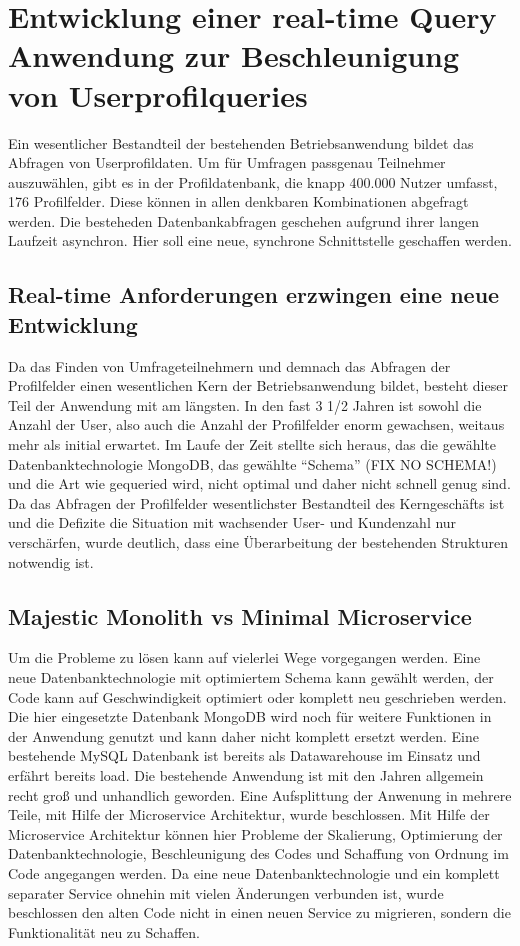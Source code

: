 \chapter{Entwicklung einer real-time Query Anwendung zur Beschleunigung von Userprofilqueries}
Ein wesentlicher Bestandteil der bestehenden Betriebsanwendung bildet das Abfragen von Userprofildaten. Um für Umfragen passgenau Teilnehmer auszuwählen, gibt es in der Profildatenbank, die knapp 400.000 Nutzer umfasst, 176 Profilfelder. Diese können in allen denkbaren Kombinationen abgefragt werden. Die besteheden Datenbankabfragen geschehen aufgrund ihrer langen Laufzeit asynchron. Hier soll eine neue, synchrone Schnittstelle geschaffen werden.

\section{Real-time Anforderungen erzwingen eine neue Entwicklung}
Da das Finden von Umfrageteilnehmern und demnach das Abfragen der Profilfelder einen wesentlichen Kern der Betriebsanwendung bildet, besteht dieser Teil der Anwendung mit am längsten. In den fast 3 1/2 Jahren ist sowohl die Anzahl der User, also auch die Anzahl der Profilfelder enorm gewachsen, weitaus mehr als initial erwartet. Im Laufe der Zeit stellte sich heraus, das die gewählte Datenbanktechnologie MongoDB, das gewählte ``Schema'' (FIX NO SCHEMA!) und die Art wie gequeried wird, nicht optimal und daher nicht schnell genug sind. Da das Abfragen der Profilfelder wesentlichster Bestandteil des Kerngeschäfts ist und die Defizite die Situation mit wachsender User- und Kundenzahl nur verschärfen, wurde deutlich, dass eine Überarbeitung der bestehenden Strukturen notwendig ist.

\section{Majestic Monolith vs Minimal Microservice}
Um die Probleme zu lösen kann auf vielerlei Wege vorgegangen werden. Eine neue Datenbanktechnologie mit optimiertem Schema kann gewählt werden, der Code kann auf Geschwindigkeit optimiert oder komplett neu geschrieben werden.
Die hier eingesetzte Datenbank MongoDB wird noch für weitere Funktionen in der Anwendung genutzt und kann daher nicht komplett ersetzt werden. Eine bestehende MySQL Datenbank ist bereits als Datawarehouse im Einsatz und erfährt bereits load.
Die bestehende Anwendung ist mit den Jahren allgemein recht groß und unhandlich geworden.
Eine Aufsplittung der Anwenung in mehrere Teile, mit Hilfe der Microservice Architektur, wurde beschlossen.
Mit Hilfe der Microservice Architektur können hier Probleme der Skalierung, Optimierung der Datenbanktechnologie, Beschleunigung des Codes und Schaffung von Ordnung im Code angegangen werden.
Da eine neue Datenbanktechnologie und ein komplett separater Service ohnehin mit vielen Änderungen verbunden ist, wurde beschlossen den alten Code nicht in einen neuen Service zu migrieren, sondern die Funktionalität neu zu Schaffen.

